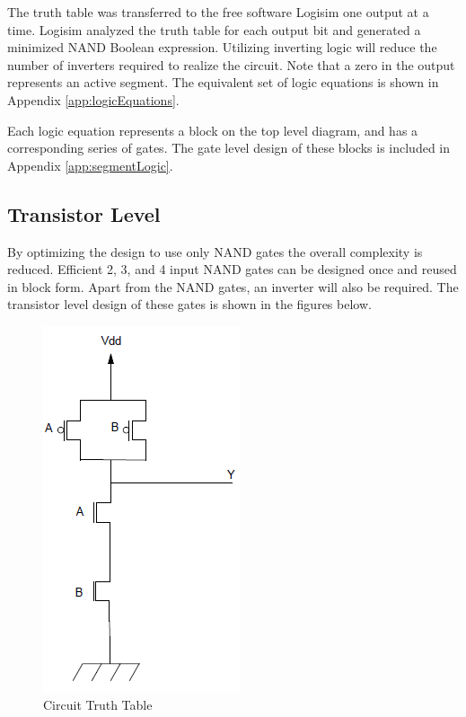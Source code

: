 \documentclass[12pt]{article}
\begin{document}
The truth table was transferred to the free software Logisim one output at a time.  
Logisim analyzed the truth table for each output bit and generated a minimized NAND Boolean expression.  
Utilizing inverting logic will reduce the number of inverters required to realize the circuit.
Note that a zero in the output represents an active segment.
The equivalent set of logic equations is shown in Appendix \ref{app:logicEquations}.

Each logic equation represents a block on the top level diagram, and has a corresponding series of gates. The gate level design of these blocks is included in Appendix \ref{app:segmentLogic}.

\subsection{Transistor Level}

By optimizing the design to use only NAND gates the overall complexity is reduced. 
Efficient 2, 3, and 4 input NAND gates can be designed once and reused in block form.
Apart from the NAND gates, an inverter will also be required.
The transistor level design of these gates is shown in the figures below.

\begin{figure}[h]
	\centering
	\includegraphics[scale=.5]{NAND_2_Trans.png}
	\caption{Circuit Truth Table}
	\label{fig:2nandTran}
\end{figure}
\end{document}
